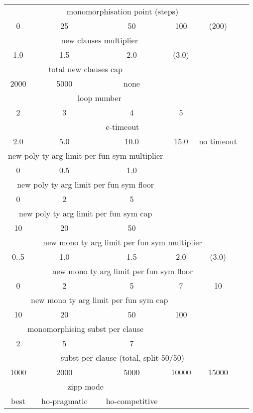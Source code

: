 \documentclass{article}
\begin{document}
\begin{center}
\begin{tabular}{cccccc}
   \toprule
   \multicolumn{5}{c}{monomorphisation point (steps)} \\
   0 & 25 & 50 & 100 & (200) \\
   \midrule
   \multicolumn{4}{c}{new clauses multiplier} \\
   1.0 & 1.5 & 2.0 & (3.0) \\
   \midrule
   \multicolumn{3}{c}{total new clauses cap} \\
   2000 & 5000 & none\\
   \midrule
   \multicolumn{4}{c}{loop number} \\
   2 & 3 & 4 & 5 \\
   \midrule
   \multicolumn{5}{c}{e-timeout} \\
   2.0 & 5.0 & 10.0 & 15.0 & no timeout \\
   \midrule
   \multicolumn{3}{c}{new poly ty arg limit per fun sym multiplier} \\
   0 & 0.5 & 1.0  \\
   \midrule
   \multicolumn{3}{c}{new poly ty arg limit per fun sym floor} \\
   0 & 2 & 5  \\
   \midrule
   \multicolumn{3}{c}{new poly ty arg limit per fun sym cap} \\
   10 & 20 & 50  \\
   \midrule
   \multicolumn{5}{c}{new mono ty arg limit per fun sym multiplier} \\
   0..5 & 1.0 & 1.5 & 2.0 & (3.0)\\
   \midrule
   \multicolumn{5}{c}{new mono ty arg limit per fun sym floor} \\
   0 & 2 & 5 & 7 & 10\\
   \midrule
   \multicolumn{4}{c}{new mono ty arg limit per fun sym cap} \\
   10 & 20 & 50 & 100  \\
   \midrule
   \multicolumn{3}{c}{monomorphising subst per clause} \\
   2 & 5 & 7  \\
   \midrule
   \multicolumn{5}{c}{subst per clause (total, split 50/50)} \\
   1000 & 2000 & 5000 & 10000 & 15000  \\
   \midrule
   \multicolumn{3}{c}{zipp mode} \\
   best & ho-pragmatic & ho-competitive \\


   \bottomrule
\end{tabular}
\end{center}
\end{document}
